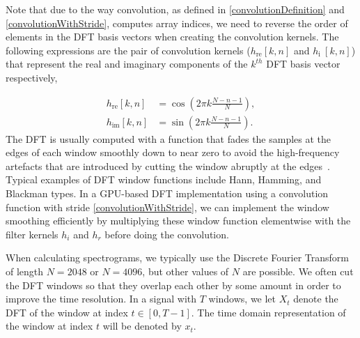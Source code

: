 \documentclass{ieeeaccess}
\newcommand{\nbh}[1]{\texttt{#1}}
\begin{document}
Note that due to the way convolution, as defined in \eqref{convolutionDefinition} and \eqref{convolutionWithStride}, computes array indices, we need to reverse the order of elements in the DFT basis vectors when creating the convolution kernels. The following expressions are the pair of convolution kernels ($h_{\text{re}}[k,n]$ and $h_{\text{i }}[k,n]$) that represent the real and imaginary components of the $k^{th}$ DFT basis vector respectively,


\begin{align}
    h_{\text{re}}[k,n] &= \cos(2\pi k \frac{N-n-1}{N}),\\
    h_{\text{im}}[k,n] &= \sin(2\pi k \frac{N-n-1}{N}).
\end{align}
The DFT is usually computed with a function that fades the samples at the edges of each window smoothly down to near zero to avoid the high-frequency artefacts that are introduced by cutting the window abruptly at the edges~\cite{Oppenheim1989DiscretetimeSP}. Typical examples of DFT window functions include Hann, Hamming, and Blackman types. In a GPU-based DFT implementation using a convolution function with stride \eqref{convolutionWithStride}, we can implement the window smoothing efficiently by multiplying these window function elementwise with the filter kernels $h_i$ and $h_r$ before doing the convolution. 


When calculating spectrograms, we typically use the Discrete Fourier Transform of length $N=2048$ or $N=4096$, but other values of $N$ are possible. We often cut the DFT windows so that they overlap each other by some amount in order to improve the time resolution. In a signal with $T$ windows, we let $X_t$ denote the DFT of the window at index $t \in [0,T-1]$. The time domain representation of the window at index $t$ will be denoted by $x_t$. 



\end{document}
